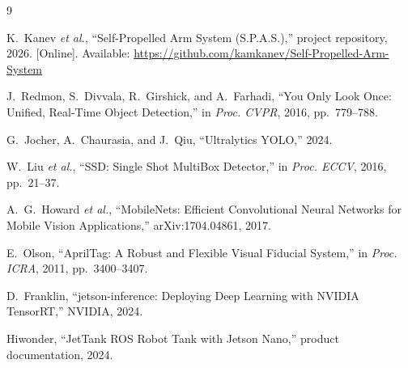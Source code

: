 \documentclass[conference,a4paper,10pt]{IEEEtran}
\begin{document}
\begin{thebibliography}{9}
\footnotesize

K.~Kanev \emph{et al.}, ``Self-Propelled Arm System (S.P.A.S.),'' project
repository, 2026. [Online]. Available:
\url{https://github.com/kamkanev/Self-Propelled-Arm-System}

J.~Redmon, S.~Divvala, R.~Girshick, and A.~Farhadi, ``You Only Look Once:
Unified, Real-Time Object Detection,'' in \emph{Proc. CVPR}, 2016,
pp.~779--788.

G.~Jocher, A.~Chaurasia, and J.~Qiu, ``Ultralytics YOLO,'' 2024.

W.~Liu \emph{et al.}, ``SSD: Single Shot MultiBox Detector,'' in
\emph{Proc. ECCV}, 2016, pp.~21--37.

A.~G.~Howard \emph{et al.}, ``MobileNets: Efficient Convolutional Neural
Networks for Mobile Vision Applications,'' arXiv:1704.04861, 2017.

E.~Olson, ``AprilTag: A Robust and Flexible Visual Fiducial System,'' in
\emph{Proc. ICRA}, 2011, pp.~3400--3407.

D.~Franklin, ``jetson-inference: Deploying Deep Learning with NVIDIA
TensorRT,'' NVIDIA, 2024.

Hiwonder, ``JetTank ROS Robot Tank with Jetson Nano,'' product
documentation, 2024.

\end{thebibliography}
\end{document}
